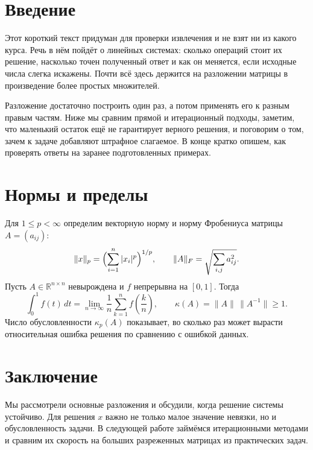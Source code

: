 \documentclass[12pt]{article}
\begin{document}
\section*{Введение}

Этот короткий текст придуман для проверки извлечения и не взят ни из какого курса. Речь в
нём пойдёт о линейных системах: сколько операций стоит их решение, насколько точен
полученный ответ и как он меняется, если исходные числа слегка искажены. Почти всё здесь
держится на разложении матрицы в произведение более простых множителей.

Разложение достаточно построить один раз, а потом применять его к разным правым частям.
Ниже мы сравним прямой и итерационный подходы, заметим, что маленький остаток ещё не
гарантирует верного решения, и поговорим о том, зачем к задаче добавляют штрафное слагаемое.
В конце кратко опишем, как проверять ответы на заранее подготовленных примерах.

\newpage
\section*{Нормы и пределы}

Для $1 \le p < \infty$ определим векторную норму и норму Фробениуса матрицы $A = (a_{ij})$:
\[
  \|x\|_p = \Bigl(\sum_{i=1}^{n} |x_i|^p\Bigr)^{1/p}, \qquad
  \|A\|_F = \sqrt{\sum_{i,j} a_{ij}^2}.
\]
Пусть $A \in \mathbb{R}^{n \times n}$ невырождена и $f$ непрерывна на $[0, 1]$. Тогда
\[
  \int_0^1 f(t)\,dt = \lim_{n \to \infty} \frac{1}{n} \sum_{k=1}^{n} f\!\left(\frac{k}{n}\right),
  \qquad \kappa(A) = \|A\|\,\|A^{-1}\| \ge 1.
\]
Число обусловленности $\kappa_p(A)$ показывает, во сколько раз может вырасти относительная
ошибка решения по сравнению с ошибкой данных.

\newpage
\section*{Заключение}

Мы рассмотрели основные разложения и обсудили, когда решение системы устойчиво. Для
решения $x$ важно не только малое значение невязки, но и обусловленность задачи. В
следующей работе займёмся итерационными методами и сравним их скорость на больших
разреженных матрицах из практических задач.
\end{document}
